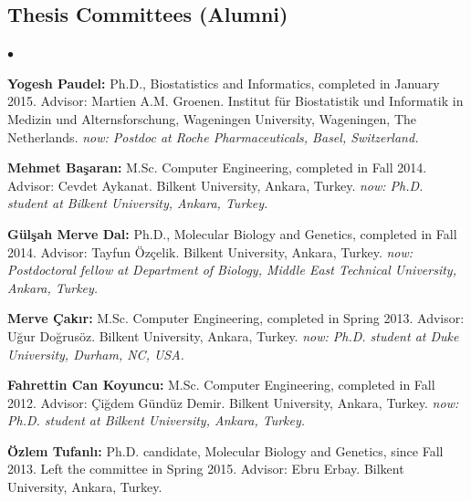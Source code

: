 \documentclass[margin,line]{res}
\newenvironment{list2}{
  \begin{list}{$\bullet$}{%
      \setlength{\itemsep}{0in}
      \setlength{\parsep}{0in} \setlength{\parskip}{0in}
      \setlength{\topsep}{0in} \setlength{\partopsep}{0in} 
      \setlength{\leftmargin}{0.2in}}}{\end{list}}
\begin{document}
\begin{resume}
\vspace*{-.6cm}
\subsection{\small \sc Thesis Committees (Alumni)}
\begin{list2}
\item
  {\bf Yogesh Paudel:} Ph.D., Biostatistics and Informatics, completed in January 2015.
  Advisor: Martien A.M. Groenen.
  Institut für Biostatistik und Informatik in Medizin und Alternsforschung,  Wageningen University, Wageningen, The Netherlands.
  {\it now: Postdoc at Roche Pharmaceuticals, Basel, Switzerland.}
\item
  {\bf Mehmet Başaran:} M.Sc. Computer Engineering, completed in Fall 2014. Advisor: Cevdet Aykanat.
  Bilkent University, Ankara, Turkey. {\it now: Ph.D. student at Bilkent University, Ankara, Turkey.}
\item
  {\bf G\"{u}l\c{s}ah Merve Dal:} Ph.D., Molecular Biology and Genetics, completed in Fall 2014.
  Advisor: Tayfun Özçelik.
  Bilkent University, Ankara, Turkey. {\it now: Postdoctoral fellow at Department of Biology, Middle East Technical University, Ankara, Turkey.}
\item
  {\bf Merve Çakır:} M.Sc. Computer Engineering, completed in Spring 2013. Advisor: Uğur Doğrusöz.
  Bilkent University, Ankara, Turkey. {\it now: Ph.D. student at Duke University, Durham, NC, USA.}
\item
  {\bf Fahrettin Can Koyuncu:} M.Sc. Computer Engineering, completed in Fall 2012. Advisor: Çiğdem Gündüz Demir.
  Bilkent University, Ankara, Turkey. {\it now: Ph.D. student at Bilkent University, Ankara, Turkey.}
\item
  {\bf Özlem Tufanlı:} Ph.D. candidate, Molecular Biology and Genetics, since Fall 2013. Left the committee in Spring 2015.
  Advisor: Ebru Erbay.
  Bilkent University, Ankara, Turkey.
  \end{list2}

  \vspace*{-.6cm}

\end{resume}
\end{document}
